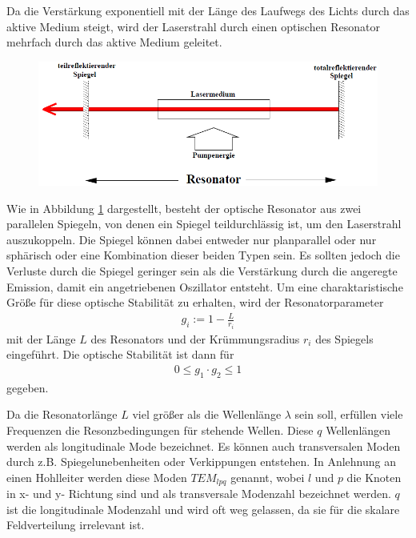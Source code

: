 \documentclass[]{scrartcl}
\begin{document}
Da die Verstärkung exponentiell mit der Länge des Laufwegs des Lichts durch das aktive Medium steigt, wird der Laserstrahl durch einen optischen Resonator mehrfach durch das aktive Medium geleitet.

\begin{figure}[h]
 \centering
 \includegraphics[]{images/schema_resonator.png}
\label{fig:schema_resonator}
\end{figure}

Wie in Abbildung \ref{fig:schema_resonator} dargestellt, besteht der optische Resonator aus zwei parallelen Spiegeln, von denen ein Spiegel teildurchlässig ist, um den Laserstrahl auszukoppeln.
Die Spiegel können dabei entweder nur planparallel oder nur sphärisch oder eine Kombination dieser beiden Typen sein.
Es sollten jedoch die Verluste durch die Spiegel geringer sein als die Verstärkung durch die angeregte Emission, damit ein angetriebenen Oszillator entsteht.
Um eine charaktaristische Größe für diese optische Stabilität zu erhalten, wird der Resonatorparameter
\begin{align}
 g_i := 1- \frac{L}{r_i}
\end{align}
mit der Länge $L$ des Resonators und der Krümmungsradius $r_i$ des Spiegels eingeführt.
Die optische Stabilität ist dann für
\begin{align}
0 \le g_1 \cdot g_2 \le 1 
\end{align}
gegeben.

Da die Resonatorlänge $L$ viel größer als die Wellenlänge $\lambda$ sein soll, erfüllen viele Frequenzen die Resonzbedingungen für stehende Wellen. 
Diese $q$ Wellenlängen werden als longitudinale Mode bezeichnet. Es können auch transversalen Moden durch z.B. Spiegelunebenheiten oder Verkippungen entstehen.
In Anlehnung an einen Hohlleiter werden diese Moden $TEM_{lpq}$ genannt, wobei $l$ und $p$ die Knoten in x- und y- Richtung sind und als transversale Modenzahl bezeichnet werden.
$q$ ist die longitudinale Modenzahl und wird oft weg gelassen, da sie für die skalare Feldverteilung irrelevant ist.  
\end{document}
